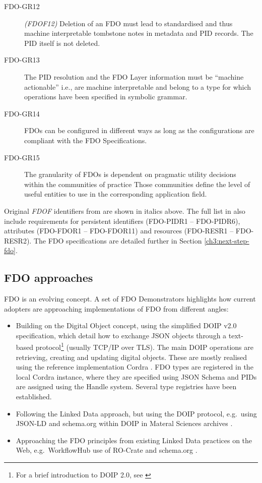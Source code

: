 \begin{description}
\item[FDO-GR12] \emph{(FDOF12)} Deletion of an FDO must lead to standardised and thus machine interpretable tombstone notes in metadata and PID records.  The PID itself is not deleted.
\item[FDO-GR13] The PID resolution and the FDO Layer information must be “machine actionable” i.e., are machine interpretable and belong to a type for which operations have been specified in symbolic grammar. 
\item[FDO-GR14] FDOs can be configured in different ways as long as the configurations are compliant with the FDO Specifications. 
\item[FDO-GR15] The granularity of FDOs is dependent on pragmatic utility decisions within the communities of practice Those communities define the level of useful entities to use in the corresponding application field.
\end{description}

Original \emph{FDOF} identifiers from \cite{Bonino 2019} are shown in italics above.
The full list in \cite{Anders 2023} also include requirements for persistent identifiers (FDO-PIDR1 -- FDO-PIDR6), attributes (FDO-FDOR1 -- FDO-FDOR11) and resources (FDO-RESR1 -- FDO-RESR2). 
The FDO specifications are detailed further in Section \vref{ch3:next-step-fdo}.

  


\subsection{FDO approaches}\label{ch3:fdo-approaches}

FDO is an evolving concept. A set of FDO Demonstrators \cite{Wittenburg 2022a} highlights how current adopters are approaching implementations of FDO from different angles:

\begin{itemize}
\tightlist
\item
  Building on the Digital Object concept, using the simplified \acrfull{DOIP} v2.0 \cite{DONA 2018} specification, which detail how to exchange \gls{JSON} objects through a text-based protocol\footnote{For a brief introduction to DOIP 2.0, see \cite{CNRI 2023b}} (usually TCP/IP over TLS). The main DOIP operations are retrieving, creating and updating digital objects. These are mostly realised using the reference implementation Cordra \cite{Tupelo-Scheck 2022}. FDO types are registered in the local Cordra instance, where they are specified using JSON Schema \cite{Wright 2022} and PIDs are assigned using the Handle system. Several type registries have been established.
\item
  Following the Linked Data approach, but using the DOIP protocol, e.g.~using \gls{JSON-LD} and schema.org within DOIP in Materal Sciences archives \cite{Riccardi 2022}.
\item
  Approaching the FDO principles from existing Linked Data practices on the Web, e.g.~WorkflowHub use of RO-Crate and schema.org \cite{Soiland-Reyes 2022c}.
\end{itemize}

